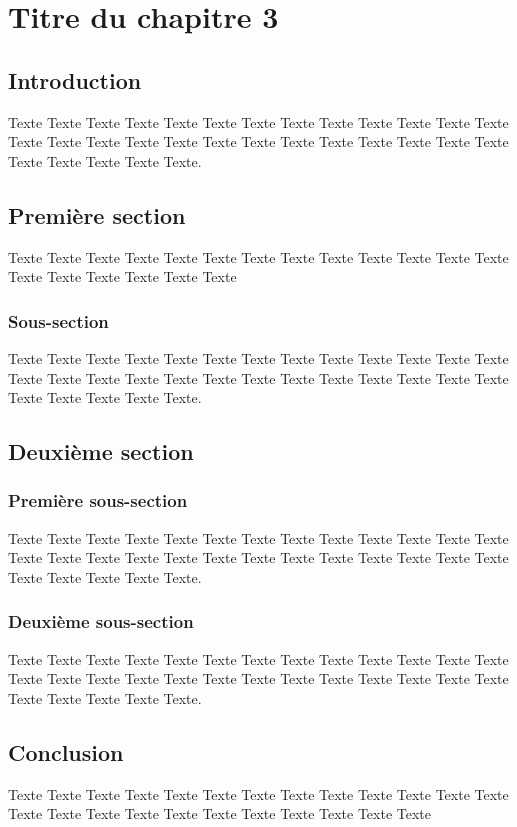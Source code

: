 \chapter{Titre du chapitre 3}

\section{Introduction} 

Texte Texte Texte Texte Texte Texte Texte Texte Texte Texte Texte Texte Texte Texte Texte Texte Texte Texte Texte Texte Texte Texte Texte Texte Texte Texte Texte Texte Texte Texte Texte.

\section{Première section}

Texte Texte Texte Texte Texte Texte Texte Texte Texte Texte Texte Texte Texte Texte Texte Texte Texte Texte Texte

\subsection{Sous-section}

Texte Texte Texte Texte Texte Texte Texte Texte Texte Texte Texte Texte Texte Texte Texte Texte Texte Texte Texte Texte Texte Texte Texte Texte Texte Texte Texte Texte Texte Texte Texte.

\section{Deuxième section}

\subsection{Première sous-section}

Texte Texte Texte Texte Texte Texte Texte Texte Texte Texte Texte Texte Texte Texte Texte Texte Texte Texte Texte Texte Texte Texte Texte Texte Texte Texte Texte Texte Texte Texte Texte.

\subsection{Deuxième sous-section}

Texte Texte Texte Texte Texte Texte Texte Texte Texte Texte Texte Texte Texte Texte Texte Texte Texte Texte Texte Texte Texte Texte Texte Texte Texte Texte Texte Texte Texte Texte Texte.

\section{Conclusion} 

Texte Texte Texte Texte Texte Texte Texte Texte Texte Texte Texte Texte Texte Texte Texte Texte Texte Texte Texte Texte Texte Texte Texte Texte